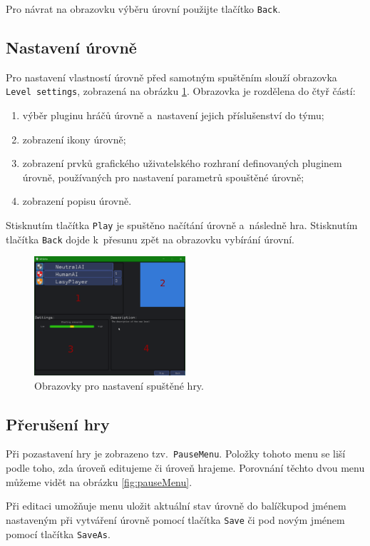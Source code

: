 Pro návrat na obrazovku výběru úrovní použijte tlačítko \texttt{Back}.

\subsection{Nastavení úrovně}
Pro nastavení vlastností úrovně před samotným spuštěním slouží obrazovka \texttt{Level settings}, zobrazená na obrázku \ref{fig:levelsettings}. Obrazovka je rozdělena do čtyř částí:

\begin{enumerate}
	\item výběr pluginu hráčů úrovně a~nastavení jejich příslušenství do týmu;
	\item zobrazení ikony úrovně;
	\item zobrazení prvků grafického uživatelského rozhraní definovaných pluginem úrovně, používaných pro nastavení parametrů spouštěné úrovně;
	\item zobrazení popisu úrovně.
\end{enumerate}

Stisknutím tlačítka \texttt{Play} je spuštěno načítání úrovně a~následně hra. Stisknutím tlačítka \texttt{Back} dojde k~přesunu zpět na obrazovku vybírání úrovní.

\begin{figure}[h]
	\centering
	\includegraphics[width=0.5\textwidth]{img/LevelSettingsScreen.png}
	\caption{Obrazovky pro nastavení spuštěné hry.}
	\label{fig:levelsettings}
\end{figure}

\subsection{Přerušení hry}
Při pozastavení hry je zobrazeno tzv.~\texttt{PauseMenu}. Položky tohoto menu se liší podle toho, zda úroveň editujeme či úroveň hrajeme. Porovnání těchto dvou menu můžeme vidět na obrázku \ref{fig:pauseMenu}.

Při editaci umožňuje menu uložit aktuální stav úrovně do balíčkupod jménem nastaveným při vytváření úrovně pomocí tlačítka \texttt{Save} či pod novým jménem pomocí tlačítka \texttt{SaveAs}.

